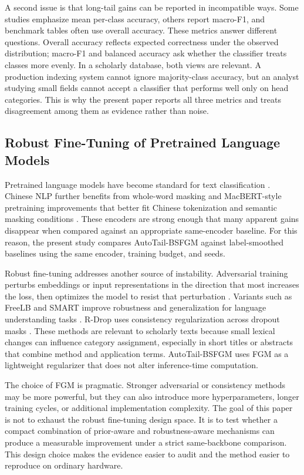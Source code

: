 \documentclass[10pt]{article}
\begin{document}
A second issue is that long-tail gains can be reported in incompatible ways. Some studies emphasize mean per-class accuracy, others report macro-F1, and benchmark tables often use overall accuracy. These metrics answer different questions. Overall accuracy reflects expected correctness under the observed distribution; macro-F1 and balanced accuracy ask whether the classifier treats classes more evenly. In a scholarly database, both views are relevant. A production indexing system cannot ignore majority-class accuracy, but an analyst studying small fields cannot accept a classifier that performs well only on head categories. This is why the present paper reports all three metrics and treats disagreement among them as evidence rather than noise.

\subsection{Robust Fine-Tuning of Pretrained Language Models}

Pretrained language models have become standard for text classification \citep{devlin2019bert,liu2019roberta}. Chinese NLP further benefits from whole-word masking and MacBERT-style pretraining improvements that better fit Chinese tokenization and semantic masking conditions \citep{cui2019wwm,cui2020revisiting}. These encoders are strong enough that many apparent gains disappear when compared against an appropriate same-encoder baseline. For this reason, the present study compares AutoTail-BSFGM against label-smoothed baselines using the same encoder, training budget, and seeds.

Robust fine-tuning addresses another source of instability. Adversarial training perturbs embeddings or input representations in the direction that most increases the loss, then optimizes the model to resist that perturbation \citep{goodfellow2015explaining,miyato2016adversarial}. Variants such as FreeLB and SMART improve robustness and generalization for language understanding tasks \citep{zhu2020freelb,jiang2020smart}. R-Drop uses consistency regularization across dropout masks \citep{liang2021rdrop}. These methods are relevant to scholarly texts because small lexical changes can influence category assignment, especially in short titles or abstracts that combine method and application terms. AutoTail-BSFGM uses FGM as a lightweight regularizer that does not alter inference-time computation.

The choice of FGM is pragmatic. Stronger adversarial or consistency methods may be more powerful, but they can also introduce more hyperparameters, longer training cycles, or additional implementation complexity. The goal of this paper is not to exhaust the robust fine-tuning design space. It is to test whether a compact combination of prior-aware and robustness-aware mechanisms can produce a measurable improvement under a strict same-backbone comparison. This design choice makes the evidence easier to audit and the method easier to reproduce on ordinary hardware.
\end{document}
